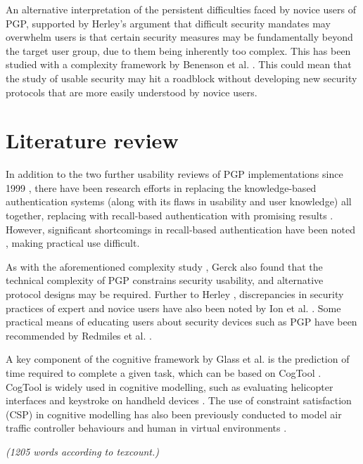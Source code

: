 \documentclass[11pt]{article}
\begin{document}
An alternative interpretation of the persistent difficulties faced by novice users of PGP, supported by Herley's \cite{herley2014more} argument that difficult security mandates may overwhelm users is that certain security measures may be fundamentally beyond the target user group, due to them being inherently too complex. This has been studied with a complexity framework by Benenson et al. \cite{benenson2015maybe}. This could mean that the study of usable security may hit a roadblock without developing new security protocols that are more easily understood by novice users.

\section{Literature review}

In addition to the two further usability reviews of PGP implementations since 1999 \cite{sheng2006johnny, ruoti2015johnny}, there have been research efforts in replacing the knowledge-based authentication
systems (along with its flaws in usability and user knowledge) all together, replacing with recall-based authentication with promising results \cite{dhamija2000deja}. However, significant shortcomings in recall-based authentication have been noted \cite{wiedenbeck2005passpoints}, making practical use difficult. 

As with the aforementioned complexity study \cite{benenson2015maybe}, Gerck \cite{gerck2007secure} also found that the technical complexity of PGP constrains security usability, and alternative protocol designs may be required. Further to Herley \cite{herley2014more}, discrepancies in security practices of expert and novice users have also been noted by Ion et al. \cite{ion2015no}. Some practical means of educating users about security devices such as PGP have been recommended by Redmiles et al. \cite{redmiles2016think}. 

A key component of the cognitive framework by Glass et al. \cite[III. A.]{glass2016usability} is the prediction of time required to complete a given task, which can be based on CogTool \cite{bellamy2011deploying}. CogTool is widely used in cognitive modelling, such as evaluating helicopter interfaces \cite{ludwig2006comparing} and keystroke on handheld devices \cite{luo2005predicting}. The use of constraint satisfaction (CSP) in cognitive modelling has also been previously conducted to model air traffic controller behaviours \cite{cerone2005formal} and human in virtual environments \cite{smith1999using}.

\emph{(1205 words according to texcount.)}


\footnotesize{}
\end{document}
